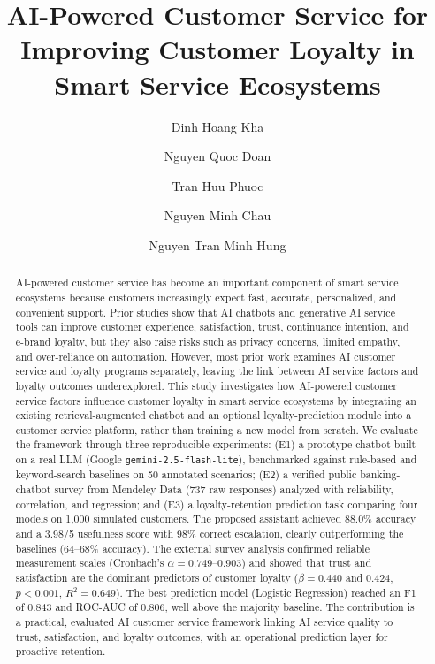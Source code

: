 \documentclass[runningheads]{llncs}
\begin{document}
%
\title{AI-Powered Customer Service for Improving Customer Loyalty in Smart Service Ecosystems}
%
\author{Dinh Hoang Kha \and
Nguyen Quoc Doan \and
Tran Huu Phuoc \and
Nguyen Minh Chau \and
Nguyen Tran Minh Hung}
%
%
%
\maketitle
%
\begin{abstract}
AI-powered customer service has become an important component of smart service ecosystems because customers increasingly expect fast, accurate, personalized, and convenient support. Prior studies show that AI chatbots and generative AI service tools can improve customer experience, satisfaction, trust, continuance intention, and e-brand loyalty, but they also raise risks such as privacy concerns, limited empathy, and over-reliance on automation. However, most prior work examines AI customer service and loyalty programs separately, leaving the link between AI service factors and loyalty outcomes underexplored. This study investigates how AI-powered customer service factors influence customer loyalty in smart service ecosystems by integrating an existing retrieval-augmented chatbot and an optional loyalty-prediction module into a customer service platform, rather than training a new model from scratch. We evaluate the framework through three reproducible experiments: (E1) a prototype chatbot built on a real LLM (Google \texttt{gemini-2.5-flash-lite}), benchmarked against rule-based and keyword-search baselines on 50 annotated scenarios; (E2) a verified public banking-chatbot survey from Mendeley Data (737 raw responses) analyzed with reliability, correlation, and regression; and (E3) a loyalty-retention prediction task comparing four models on 1{,}000 simulated customers. The proposed assistant achieved 88.0\% accuracy and a 3.98/5 usefulness score with 98\% correct escalation, clearly outperforming the baselines (64--68\% accuracy). The external survey analysis confirmed reliable measurement scales (Cronbach's $\alpha = 0.749$--$0.903$) and showed that trust and satisfaction are the dominant predictors of customer loyalty ($\beta = 0.440$ and $0.424$, $p < 0.001$, $R^2 = 0.649$). The best prediction model (Logistic Regression) reached an F1 of 0.843 and ROC-AUC of 0.806, well above the majority baseline. The contribution is a practical, evaluated AI customer service framework linking AI service quality to trust, satisfaction, and loyalty outcomes, with an operational prediction layer for proactive retention.

\end{abstract}
%
\end{document}
